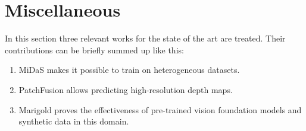 \section{Miscellaneous}
\label{sec:miscellaneous}
In this section three relevant works for the state of the art are treated.
Their contributions can be briefly summed up like this:
\begin{enumerate}
	\item{MiDaS makes it possible to train on heterogeneous datasets.}
	\item{PatchFusion allows predicting high-resolution depth maps.}
	\item{Marigold proves the effectiveness of pre-trained vision foundation models and synthetic data in this domain.}
\end{enumerate}

